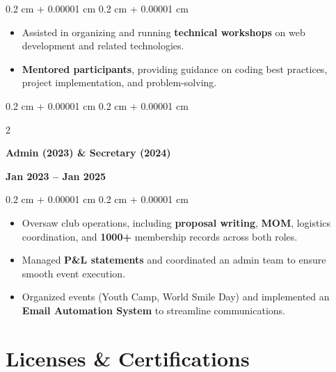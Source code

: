 \documentclass[10pt, letterpaper]{article}
\newenvironment{highlights}{
    \begin{itemize}[
        topsep=0.10 cm,
        parsep=0.10 cm,
        partopsep=0pt,
        itemsep=0pt,
        leftmargin=0.4 cm + 10pt,
        itemsep=0.1cm
    ]
}{
    \end{itemize}
} %
\newenvironment{onecolentry}{
    \begin{adjustwidth}{
        0.2 cm + 0.00001 cm
    }{
        0.2 cm + 0.00001 cm
    }
}{
    \end{adjustwidth}
} %
\newenvironment{twocolentry}[2][]{
    \onecolentry
    \def\secondColumn{#2}
    \setcolumnwidth{\fill, 4.5 cm}
    \begin{paracol}{2}
}{
    \switchcolumn \raggedleft \secondColumn
    \end{paracol}
    \endonecolentry
} %
\begin{document}
            \vspace{0.10 cm}
            \begin{onecolentry}
                \begin{highlights}
                    \item Assisted in organizing and running \textbf{technical workshops} on web development and related technologies.  
                    \item \textbf{Mentored participants}, providing guidance on coding best practices, project implementation, and problem-solving.  
                \end{highlights}
            \end{onecolentry}
    
        \vspace{0.30 cm}
        
        \begin{twocolentry}
            {\textbf{Jan 2023 – Jan 2025}}
            {\textbf{Admin (2023) \& Secretary (2024)}  \\ }
        \end{twocolentry}
        
        \vspace{0.10 cm}
        \begin{onecolentry}
            \begin{highlights}
                \item Oversaw club operations, including \textbf{proposal writing}, \textbf{MOM}, logistics coordination, and \textbf{1000+} membership records across both roles.
                \item Managed \textbf{P\&L statements} and coordinated an admin team to ensure smooth event execution.
                \item Organized events (Youth Camp, World Smile Day) and implemented an \textbf{Email Automation System} to streamline communications.
            \end{highlights}
        \end{onecolentry}

    \vspace{0.40 cm}

    \section{Licenses \& Certifications}
        \vspace{0.2cm}
        
\end{document}
